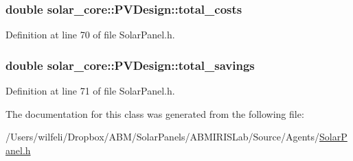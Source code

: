 \subsubsection[{total\+\_\+costs}]{\setlength{\rightskip}{0pt plus 5cm}double solar\+\_\+core\+::\+P\+V\+Design\+::total\+\_\+costs}\label{classsolar__core_1_1_p_v_design_ac015f1cf090279e45861f2860f008cc2}


Definition at line 70 of file Solar\+Panel.\+h.

\hypertarget{classsolar__core_1_1_p_v_design_a7628fe2e1ea95f8df79aca11dd5a356d}{}
\subsubsection[{total\+\_\+savings}]{\setlength{\rightskip}{0pt plus 5cm}double solar\+\_\+core\+::\+P\+V\+Design\+::total\+\_\+savings}\label{classsolar__core_1_1_p_v_design_a7628fe2e1ea95f8df79aca11dd5a356d}


Definition at line 71 of file Solar\+Panel.\+h.



The documentation for this class was generated from the following file\+:\begin{DoxyCompactItemize}
\item 
/\+Users/wilfeli/\+Dropbox/\+A\+B\+M/\+Solar\+Panels/\+A\+B\+M\+I\+R\+I\+S\+Lab/\+Source/\+Agents/\hyperlink{_solar_panel_8h}{Solar\+Panel.\+h}\end{DoxyCompactItemize}
